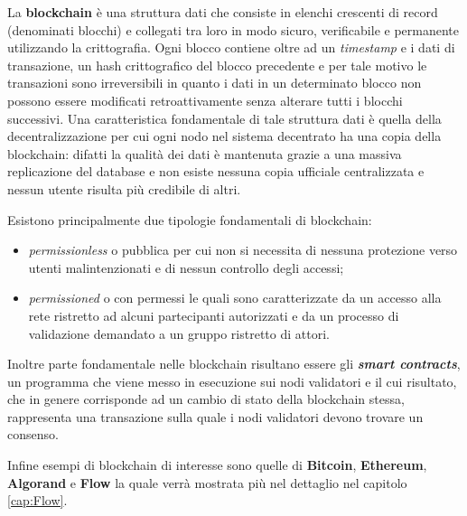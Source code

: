 La \textbf{blockchain} è una struttura dati che consiste in elenchi crescenti di record (denominati blocchi) e collegati tra loro in modo sicuro, verificabile e permanente utilizzando la crittografia. Ogni blocco contiene oltre ad un \textit{timestamp} e i dati di transazione, un hash crittografico del blocco precedente e per tale motivo le transazioni sono irreversibili in quanto i dati in un determinato blocco non possono essere modificati retroattivamente senza alterare tutti i blocchi successivi. 
Una caratteristica fondamentale di tale struttura dati è quella della decentralizzazione per cui ogni nodo nel sistema decentrato ha una copia della blockchain: difatti la qualità dei dati è mantenuta grazie a una massiva replicazione del database e non esiste nessuna copia ufficiale centralizzata e nessun utente risulta più credibile di altri.

Esistono principalmente due tipologie fondamentali di blockchain:
\begin{itemize}
    \item \textit{permissionless} o pubblica per cui non si necessita di nessuna protezione verso utenti malintenzionati e di nessun controllo degli accessi;
    \item \textit{permissioned} o con permessi le quali sono caratterizzate da un accesso alla rete ristretto ad alcuni partecipanti autorizzati e da un processo di validazione demandato a un gruppo ristretto di attori.
\end{itemize}

Inoltre parte fondamentale nelle blockchain risultano essere gli \textit{\textbf{smart contracts}}, un programma che viene messo in esecuzione sui nodi validatori e il cui risultato, che in genere corrisponde ad un cambio di stato della blockchain stessa, rappresenta una transazione sulla quale i nodi validatori devono trovare un consenso.

Infine esempi di blockchain di interesse sono quelle di \textbf{Bitcoin}, \textbf{Ethereum}, \textbf{Algorand} e \textbf{Flow} la quale verrà mostrata più nel dettaglio nel capitolo \ref{cap:Flow}.